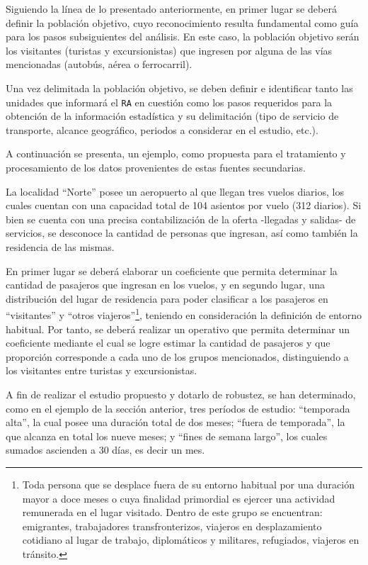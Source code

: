 \documentclass[
]{book}
\begin{document}
Siguiendo la línea de lo presentado anteriormente, en primer lugar se deberá definir la población objetivo, cuyo reconocimiento resulta fundamental como guía para los pasos subsiguientes del análisis. En este caso, la población objetivo serán los visitantes (turistas y excursionistas) que ingresen por alguna de las vías mencionadas (autobús, aérea o ferrocarril).

Una vez delimitada la población objetivo, se deben definir e identificar tanto las unidades que informará el \texttt{RA} en cuestión como los pasos requeridos para la obtención de la información estadística y su delimitación (tipo de servicio de transporte, alcance geográfico, periodos a considerar en el estudio, etc.).

A continuación se presenta, un ejemplo, como propuesta para el tratamiento y procesamiento de los datos provenientes de estas fuentes secundarias.

La localidad ``Norte'' posee un aeropuerto al que llegan tres vuelos diarios, los cuales cuentan con una capacidad total de 104 asientos por vuelo (312 diarios). Si bien se cuenta con una precisa contabilización de la oferta -llegadas y salidas- de servicios, se desconoce la cantidad de personas que ingresan, así como también la residencia de las mismas.

En primer lugar se deberá elaborar un coeficiente que permita determinar la cantidad de pasajeros que ingresan en los vuelos, y en segundo lugar, una distribución del lugar de residencia para poder clasificar a los pasajeros en ``visitantes'' y ``otros viajeros''\footnote{Toda persona que se desplace fuera de su entorno habitual por una duración mayor a doce meses o cuya finalidad primordial es ejercer una actividad remunerada en el lugar visitado. Dentro de este grupo se encuentran: emigrantes, trabajadores transfronterizos, viajeros en desplazamiento cotidiano al lugar de trabajo, diplomáticos y militares, refugiados, viajeros en tránsito.}, teniendo en consideración la definición de entorno habitual. Por tanto, se deberá realizar un operativo que permita determinar un coeficiente mediante el cual se logre estimar la cantidad de pasajeros y que proporción corresponde a cada uno de los grupos mencionados, distinguiendo a los visitantes entre turistas y excursionistas.

A fin de realizar el estudio propuesto y dotarlo de robustez, se han determinado, como en el ejemplo de la sección anterior, tres períodos de estudio: ``temporada alta'', la cual posee una duración total de dos meses; ``fuera de temporada'', la que alcanza en total los nueve meses; y ``fines de semana largo'', los cuales sumados ascienden a 30 días, es decir un mes.
\end{document}
